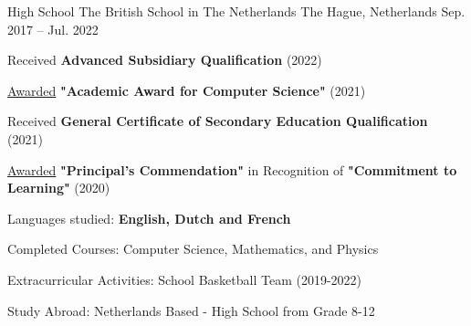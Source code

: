 

\begin{cventries}

  \cventry
    {High School} %
    {The British School in The Netherlands} %
    {The Hague, Netherlands} %
    {Sep. 2017 -- Jul. 2022} %
    {
      \begin{cvitems}
      \item {Received \textbf{Advanced Subsidiary Qualification} (2022)}
      \item {\underline{Awarded} \textbf{"Academic Award for Computer Science"} (2021)}
      \item {Received \textbf{General Certificate of Secondary Education Qualification} (2021)}
      \item {\underline{Awarded} \textbf{"Principal's Commendation"} in Recognition of \textbf{"Commitment to Learning"} (2020)}
      \item{Languages studied: \textbf{English, Dutch and French}}
      \item{Completed Courses: Computer Science, Mathematics, and Physics}
      \item{Extracurricular Activities: School Basketball Team (2019-2022)}
      \item{Study Abroad: Netherlands Based - High School from Grade 8-12}
      \end{cvitems}
    }


\end{cventries}


